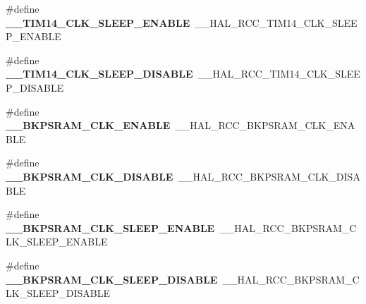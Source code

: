 \begin{DoxyCompactItemize}
\item 
\hypertarget{group___h_a_l___r_c_c___aliased_ga665eb8ea877917808e0be7ef467d1a0d}{\#define {\bfseries \-\_\-\-\_\-\-T\-I\-M14\-\_\-\-C\-L\-K\-\_\-\-S\-L\-E\-E\-P\-\_\-\-E\-N\-A\-B\-L\-E}~\-\_\-\-\_\-\-H\-A\-L\-\_\-\-R\-C\-C\-\_\-\-T\-I\-M14\-\_\-\-C\-L\-K\-\_\-\-S\-L\-E\-E\-P\-\_\-\-E\-N\-A\-B\-L\-E}\label{group___h_a_l___r_c_c___aliased_ga665eb8ea877917808e0be7ef467d1a0d}

\item 
\hypertarget{group___h_a_l___r_c_c___aliased_ga71fcbff820f7263e13dbbb2b1ae224dc}{\#define {\bfseries \-\_\-\-\_\-\-T\-I\-M14\-\_\-\-C\-L\-K\-\_\-\-S\-L\-E\-E\-P\-\_\-\-D\-I\-S\-A\-B\-L\-E}~\-\_\-\-\_\-\-H\-A\-L\-\_\-\-R\-C\-C\-\_\-\-T\-I\-M14\-\_\-\-C\-L\-K\-\_\-\-S\-L\-E\-E\-P\-\_\-\-D\-I\-S\-A\-B\-L\-E}\label{group___h_a_l___r_c_c___aliased_ga71fcbff820f7263e13dbbb2b1ae224dc}

\item 
\hypertarget{group___h_a_l___r_c_c___aliased_ga1ef09e51c04879938b3c77bab8fee584}{\#define {\bfseries \-\_\-\-\_\-\-B\-K\-P\-S\-R\-A\-M\-\_\-\-C\-L\-K\-\_\-\-E\-N\-A\-B\-L\-E}~\-\_\-\-\_\-\-H\-A\-L\-\_\-\-R\-C\-C\-\_\-\-B\-K\-P\-S\-R\-A\-M\-\_\-\-C\-L\-K\-\_\-\-E\-N\-A\-B\-L\-E}\label{group___h_a_l___r_c_c___aliased_ga1ef09e51c04879938b3c77bab8fee584}

\item 
\hypertarget{group___h_a_l___r_c_c___aliased_ga8bdedfe40e391ab3fea620a0655aa221}{\#define {\bfseries \-\_\-\-\_\-\-B\-K\-P\-S\-R\-A\-M\-\_\-\-C\-L\-K\-\_\-\-D\-I\-S\-A\-B\-L\-E}~\-\_\-\-\_\-\-H\-A\-L\-\_\-\-R\-C\-C\-\_\-\-B\-K\-P\-S\-R\-A\-M\-\_\-\-C\-L\-K\-\_\-\-D\-I\-S\-A\-B\-L\-E}\label{group___h_a_l___r_c_c___aliased_ga8bdedfe40e391ab3fea620a0655aa221}

\item 
\hypertarget{group___h_a_l___r_c_c___aliased_ga1d57b2bcc7d644008f0fa757ef43f06e}{\#define {\bfseries \-\_\-\-\_\-\-B\-K\-P\-S\-R\-A\-M\-\_\-\-C\-L\-K\-\_\-\-S\-L\-E\-E\-P\-\_\-\-E\-N\-A\-B\-L\-E}~\-\_\-\-\_\-\-H\-A\-L\-\_\-\-R\-C\-C\-\_\-\-B\-K\-P\-S\-R\-A\-M\-\_\-\-C\-L\-K\-\_\-\-S\-L\-E\-E\-P\-\_\-\-E\-N\-A\-B\-L\-E}\label{group___h_a_l___r_c_c___aliased_ga1d57b2bcc7d644008f0fa757ef43f06e}

\item 
\hypertarget{group___h_a_l___r_c_c___aliased_ga350a0726c08b726815f58e4c5689db5a}{\#define {\bfseries \-\_\-\-\_\-\-B\-K\-P\-S\-R\-A\-M\-\_\-\-C\-L\-K\-\_\-\-S\-L\-E\-E\-P\-\_\-\-D\-I\-S\-A\-B\-L\-E}~\-\_\-\-\_\-\-H\-A\-L\-\_\-\-R\-C\-C\-\_\-\-B\-K\-P\-S\-R\-A\-M\-\_\-\-C\-L\-K\-\_\-\-S\-L\-E\-E\-P\-\_\-\-D\-I\-S\-A\-B\-L\-E}\label{group___h_a_l___r_c_c___aliased_ga350a0726c08b726815f58e4c5689db5a}


\end{DoxyCompactItemize}
